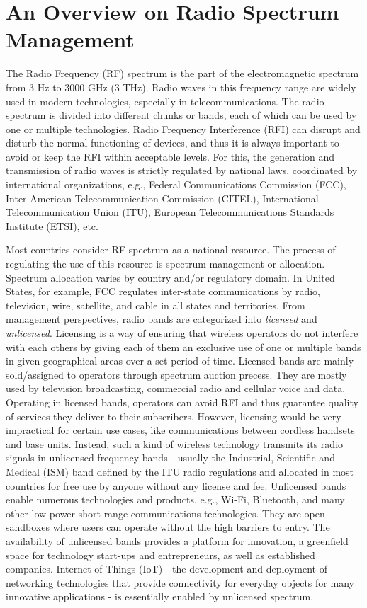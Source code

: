 \section{An Overview on Radio Spectrum Management}

The Radio Frequency (RF) spectrum is the part of the electromagnetic spectrum from $3$ Hz to $3000$ GHz ($3$ THz). Radio waves in this frequency range are widely used in modern technologies, especially in telecommunications. The radio spectrum is divided into different chunks or bands, each of which can be used by one or multiple technologies. Radio Frequency Interference (RFI) can disrupt and disturb the normal functioning of devices, and thus it is always important to avoid or keep the RFI within acceptable levels. For this, the generation and transmission of radio waves is strictly regulated by national laws, coordinated by international organizations, e.g., Federal Communications Commission (FCC), Inter-American Telecommunication Commission (CITEL), International Telecommunication Union (ITU), European Telecommunications Standards Institute (ETSI), etc. 

Most countries consider RF spectrum as a national resource. The process of regulating the use of this resource is spectrum management or allocation. Spectrum allocation varies by country and/or regulatory domain. In United States, for example, FCC regulates inter-state communications by radio, television, wire, satellite, and cable in all states and territories. From management perspectives, radio bands are categorized into \textit{licensed} and \textit{unlicensed}. Licensing is a way of ensuring that wireless operators do not interfere with each others by giving each of them an exclusive use of one or multiple bands in given geographical areas over a set period of time. Licensed bands are mainly sold/assigned to operators through spectrum auction precess. They are mostly used by television broadcasting, commercial radio and cellular voice and data. Operating in licensed bands, operators can avoid RFI and thus guarantee quality of services they deliver to their subscribers. However, licensing would be very impractical for certain use cases, like communications between cordless handsets and base units. Instead, such a kind of wireless technology transmits its radio signals in unlicensed frequency bands - usually the Industrial, Scientific and Medical (ISM) band defined by the ITU radio regulations and allocated in most countries for free use by anyone without any license and fee. Unlicensed bands enable numerous technologies and products, e.g., Wi-Fi, Bluetooth, and many other low-power short-range communications technologies. They are open sandboxes where users can operate without the high barriers to entry. The availability of unlicensed bands provides a platform for innovation, a greenfield space for technology start-ups and entrepreneurs, as well as established companies. Internet of Things (IoT) - the development and deployment of networking technologies that provide connectivity for everyday objects for many innovative applications - is essentially enabled by unlicensed spectrum.

